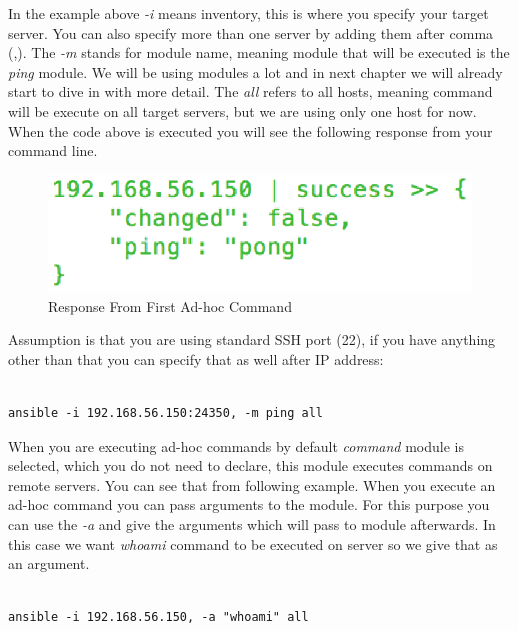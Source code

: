 \documentclass[10pt]{book}
\begin{document}
In the example above \emph{-i} means inventory, this is where you specify your target server. 
You can also specify more than one server by adding them after comma (,). The \emph{-m} stands for module name, 
meaning module that will be executed is the \emph{ping} module. We will be using modules a lot and in
next chapter we will already start to dive in with more detail. The \emph{all} 
refers to all hosts, meaning command will be execute on all target servers, 
but we are using only one host for now. When the code above is executed you will see the following response from your 
command line.


\begin{figure}[ht]
	\centering
  \includegraphics{figures/first-ad-hoc-command.eps}
	\caption{Response From First Ad-hoc Command}
\end{figure}


Assumption is that you are using standard SSH port (22), if you have anything 
other than that you can specify that as well after IP address:

\begin{Verbatim}

ansible -i 192.168.56.150:24350, -m ping all

\end{Verbatim}



When you are executing ad-hoc commands by default \emph{command} module is selected, 
which you do not need to declare, this module executes commands on remote servers. You can see that from 
following example. When you execute an ad-hoc command you can pass arguments to the module. For this 
purpose you can use the \emph{-a}  and give the arguments which will pass to 
module afterwards. In this case we want \emph{whoami} command to be executed on server so 
we give that as an argument.

\begin{Verbatim}

ansible -i 192.168.56.150, -a "whoami" all

\end{Verbatim}
\end{document}
